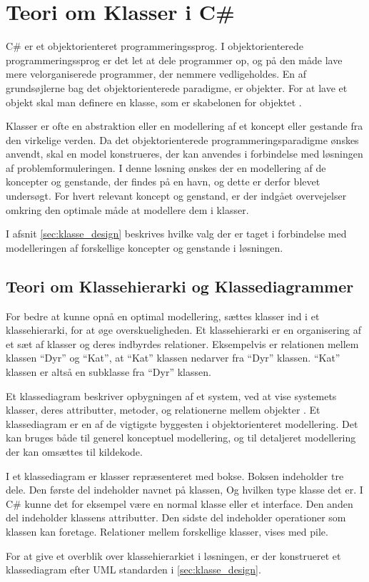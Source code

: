 \section{Teori om Klasser i C\#}
\label{sec:klasse_teori}

C\# er et objektorienteret programmeringssprog. I objektorienterede programmeringssprog er det let at dele programmer op, og på den måde lave mere velorganiserede programmer, der nemmere vedligeholdes. En af grundsøjlerne bag det objektorienterede paradigme, er objekter. For at lave et objekt skal man definere en klasse, som er skabelonen for objektet \cite{michaelis2012essential}.

Klasser er ofte en abstraktion eller en modellering af et koncept eller gestande fra den virkelige verden. Da det objektorienterede programmeringsparadigme ønskes anvendt, skal en model konstrueres, der kan anvendes i forbindelse med løsningen af problemformuleringen. I denne løsning ønskes der en modellering af de koncepter og genstande, der findes på en havn, og dette er derfor blevet undersøgt. For hvert relevant koncept og genstand, er der indgået overvejelser omkring den optimale måde at modellere dem i klasser.

I afsnit \cref{sec:klasse_design} beskrives hvilke valg der er taget i forbindelse med modelleringen af forskellige koncepter og genstande i løsningen.

\subsection{Teori om Klassehierarki og Klassediagrammer}
\label{sub:uml_teori}

For bedre at kunne opnå en optimal modellering, sættes klasser ind i et klassehierarki, for at øge overskueligheden. Et klassehierarki er en organisering af et sæt af klasser og deres indbyrdes relationer. Eksempelvis er relationen mellem klassen \enquote{Dyr} og \enquote{Kat}, at \enquote{Kat} klassen nedarver fra \enquote{Dyr} klassen. \enquote{Kat} klassen er altså en subklasse fra \enquote{Dyr} klassen.

Et klassediagram beskriver opbygningen af et system, ved at vise systemets klasser, deres attributter, metoder, og relationerne mellem objekter \cite{martin2006agile}. Et klassediagram er en af de vigtigste byggesten i objektorienteret modellering. Det kan bruges både til generel konceptuel modellering, og til detaljeret modellering der kan omsættes til kildekode.

I et klassediagram er klasser repræsenteret med bokse. Boksen indeholder tre dele. Den første del indeholder navnet på klassen, Og hvilken type klasse det er. I C\# kunne det for eksempel være en normal klasse eller et interface. Den anden del indeholder klassens attributter. Den sidste del indeholder operationer som klassen kan foretage. Relationer mellem forskellige klasser, vises med pile.

For at give et overblik over klassehierarkiet i løsningen, er der konstrueret et klassediagram efter UML standarden i \cref{sec:klasse_design}.



